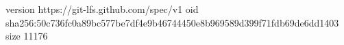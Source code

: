 version https://git-lfs.github.com/spec/v1
oid sha256:50c736fc0a89bc577be7df4e9b46744450e8b969589d399f71fdb69de6dd1403
size 11176
